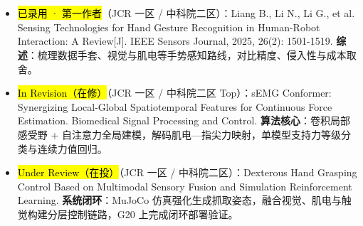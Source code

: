 \section[论文与研究成果]{}
\begin{itemize}
    \item \hl{已录用 · 第一作者}（JCR 一区 / 中科院二区）：Liang B., Li N., Li G., et al. Sensing Technologies for Hand Gesture Recognition in Human-Robot Interaction: A Review[J]. IEEE Sensors Journal, 2025, 26(2): 1501-1519. \textbf{综述}：梳理数据手套、视觉与肌电等手势感知路线，对比精度、侵入性与成本取舍。
    \item \hl{In Revision（在修）}（JCR 一区 / 中科院二区 Top）：sEMG Conformer: Synergizing Local-Global Spatiotemporal Features for Continuous Force Estimation. Biomedical Signal Processing and Control. \textbf{算法核心}：卷积局部感受野 + 自注意力全局建模，解码肌电—指尖力映射，单模型支持力等级分类与连续力值回归。
    \item \hl{Under Review（在投）}（JCR 一区 / 中科院二区）：Dexterous Hand Grasping Control Based on Multimodal Sensory Fusion and Simulation Reinforcement Learning. \textbf{系统闭环}：MuJoCo 仿真强化生成抓取姿态，融合视觉、肌电与触觉构建分层控制链路，G20 上完成闭环部署验证。
\end{itemize}


